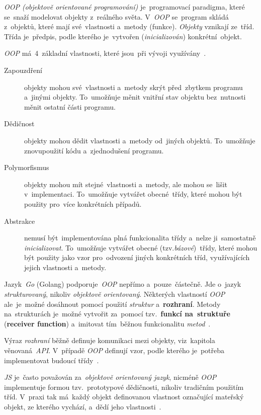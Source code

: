 \documentclass[11pt,a4paper]{report}
\let\oldacrshort\acrshort
\renewcommand{\acrshort}[1]{\emph{\normalsize\color[rgb]{0,0,0}\noindent\oldacrshort{#1}}}
\begin{document}
            \emph{OOP (objektově orientované programování)} je~programovací paradigma, které se~snaží modelovat objekty z~reálného světa. V~\emph{OOP} se~program skládá z~objektů, které mají své~vlastnosti a~metody (funkce). \emph{Objekty} vznikají ze~tříd. Třída je~předpis, podle kterého je~vytvořen (\emph{inicializován}) konkrétní~objekt.
            
            \emph{OOP} má~4~základní vlastnosti, které jsou~při vývoji využívány~\cite{Keogh:OOP}.
            \begin{description}
                \item[Zapouzdření] objekty mohou své~vlastnosti a~metody skrýt před~zbytkem programu a~jinými objekty. To~umožňuje měnit vnitřní stav objektu bez~nutnosti měnit ostatní části programu.
                \item[Dědičnost] objekty mohou dědit vlastnosti a~metody od~jiných objektů. To~umožňuje znovupoužití kódu a~zjednodušení programu.
                \item[Polymorfismus] objekty mohou mít stejné~vlastnosti a~metody, ale mohou se~lišit v~implementaci. To~umožňuje vytvářet obecné~třídy, které mohou být použity pro~více konkrétních případů.
                \item[Abstrakce] nemusí být~implementována plná funkcionalita třídy a~nelze ji~samostatně \emph{inicializovat}. To~umožňuje vytvářet obecné (tzv.\emph{bázové})~třídy, které mohou být použity jako vzor pro~odvození jiných konkrétních tříd, využívajících jejich vlastnosti a~metody.
            \end{description}

            Jazyk~\emph{Go} (Golang) podporuje~\emph{OOP} nepřímo a~pouze~částečně. Jde o~jazyk \emph{strukturovaný}, nikoliv \emph{objektově orientovaný}. Některých vlastností \emph{OOP} ale~je~možné dosáhnout pomocí použití \emph{struktur} a~\textbf{rozhraní}. Metody na~strukturách je~možné vytvořit za~pomocí tzv.~\textbf{funkcí na~struktuře} (\textbf{receiver function}) a~imitovat tím~běžnou funkcionalitu \emph{metod}~\cite{go:OOP, Scott2019:programmingpragmatics}.

            Výraz \emph{rozhraní} běžně definuje komunikaci mezi objekty, viz~kapitola věnovaná~\acrshort{API}. V~případě \emph{OOP} definují vzor, podle kterého je~potřeba implementovat budoucí třídy~\cite{go:OOP}.
            
            \acrshort{JS} je~často považován za~\emph{objektově orientovaný jazyk}, nicméně \emph{OOP} implementuje formou tzv.~prototypové dědičnosti, nikoliv tradičním použitím tříd. V~praxi tak má~každý objekt definovanou vlastnost označující mateřský objekt, ze kterého vychází, a~dědí jeho vlastnosti~\cite[2.1.01]{kantor_javascript, Scott2019:programmingpragmatics}.
            
\end{document}
